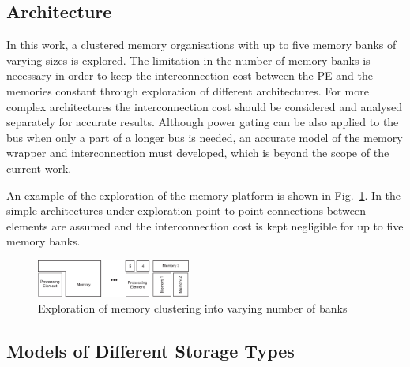 \documentclass[a4paper,conference]{IEEEtran}
\begin{document}
\subsection{Architecture}

In this work, a clustered memory organisations with up to five memory banks of varying sizes is explored. The limitation in the number of memory banks is necessary in order to keep the interconnection cost between the PE and the memories constant through exploration of different architectures. For more complex architectures the interconnection cost should be considered and analysed separately for accurate results. Although power gating can be also applied to the bus when only a part of a longer bus is needed, an accurate model of the memory wrapper and interconnection must developed, which is beyond the scope of the current work. 

An example of the exploration of the memory platform is shown in Fig.~\ref{fig:platform}. In the simple architectures under exploration point-to-point connections between elements are assumed and the interconnection cost is kept negligible for up to five memory banks.

\begin{figure}[!t]
\centering
\includegraphics[width=0.45\textwidth]{Images/platform.eps}
\caption{Exploration of memory clustering into varying number of banks}
\label{fig:platform}
\end{figure}

\subsection{Models of Different Storage Types}
\end{document}

